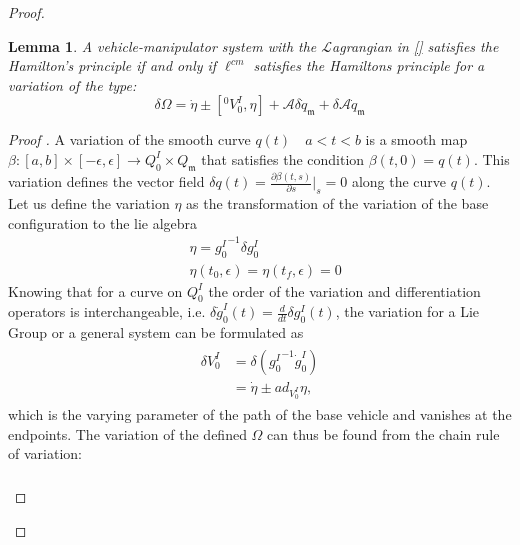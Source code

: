 \documentclass[lettersize,journal]{IEEEtran}
\def \L {\mathcal{L}}
\def \A {\mathcal{A}}
\newtheorem{lemma}{Lemma}
\theoremstyle{remark}
\begin{document}
\begin{proof}[Proof]

\begin{lemma}\label{varlemma}
A vehicle-manipulator system with the $\L$agrangian in \eqref{} satisfies the Hamilton's principle if and only if $\ell^{cm}$ satisfies the Hamiltons principle for a variation of the type:
\begin{equation}
    \delta \Omega= \dot{\eta}\pm [{}^0V^I_0,\eta] + \A\delta \dot{q}_\mathfrak{m}+\delta \A\dot{q}_\mathfrak{m}
\end{equation}
\end{lemma}
\begin{proof}[Proof ]
A variation of the smooth curve $q(t) \quad a<t<b $ is a smooth map $\beta: [a,b]\times[-\epsilon,\epsilon]\rightarrow Q^I_0\times Q_\mathfrak{m}$ that  satisfies  the  condition $\beta(t,0)  =q(t)$.  This  variation defines the vector field $\delta q(t) =\frac{\partial \beta(t,s)}{\partial s} |_s=0 $ along the curve $q(t)$. Let us define the variation $\eta$ as the transformation of the variation of the base configuration to the lie algebra
\begin{align}
  &\eta={g^I_0}^{-1}\delta g^I_0\\ &\eta(t_0,\epsilon)=\eta(t_f,\epsilon)=0
  \label{etadefinition}
\end{align}
Knowing
that for a curve on $Q^I_0$ the order of the variation and differentiation operators is interchangeable, i.e. $\delta \dot{g}^I_0(t)=\frac{d}{dt}\delta g^I_0(t)$, the variation for a Lie Group or a general system can be formulated as
\begin{align}
  \begin{split}
    \delta V^I_0  &=\delta({g^I_0}^{-1}\dot{g}^I_0)\\
                  &=\dot{\eta}\pm ad_{V^I_0} \eta,
\end{split}
\end{align}
which is the varying parameter of the path of the base vehicle and vanishes at the endpoints. The variation of the defined $\Omega$ can thus be found from the chain rule of variation:
\begin{align}
\begin{split}

\end{split}
\end{align}
\end{proof}
\end{proof}
\end{document}
